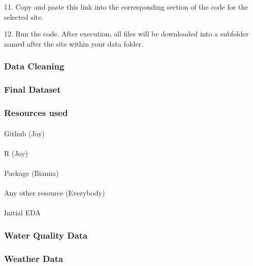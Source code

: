 \documentclass[
  letterpaper,
  DIV=11,
  numbers=noendperiod]{scrartcl}
\makeatletter
\let\oldparagraph\paragraph
\renewcommand{\paragraph}{
    \@ifstar
      \xxxParagraphStar
      \xxxParagraphNoStar
  }
\newcommand{\xxxParagraphStar}[1]{\oldparagraph*{#1}\mbox{}}
\newcommand{\xxxParagraphNoStar}[1]{\oldparagraph{#1}\mbox{}}
\makeatother
\begin{document}
11. Copy and paste this link into the corresponding section of the code
for the selected site.

12. Run the code. After execution, all files will be downloaded into a
subfolder named after the site within your data folder.

\subsubsection{Data Cleaning}\label{data-cleaning}

\subsubsection{Final Dataset}\label{final-dataset}

\subsubsection{Resources used}\label{resources-used}

\paragraph{Github (Joy)}\label{github-joy}

\paragraph{R (Joy)}\label{r-joy}

\paragraph{Package (Ilianna)}\label{package-ilianna}

\paragraph{Any other resource
(Everybody)}\label{any-other-resource-everybody}

\paragraph{Initial EDA}\label{initial-eda}

\subsubsection{Water Quality Data}\label{water-quality-data}

\subsubsection{Weather Data}\label{weather-data}
\end{document}

